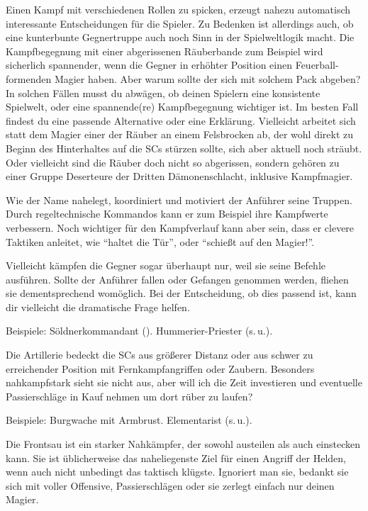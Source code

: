 Einen Kampf mit verschiedenen Rollen zu spicken, erzeugt nahezu automatisch interessante Entscheidungen für die Spieler.
Zu Bedenken ist allerdings auch, ob eine kunterbunte Gegnertruppe auch noch Sinn in der Spielweltlogik macht.
Die Kampfbegegnung mit einer abgerissenen Räuberbande zum Beispiel wird sicherlich spannender, wenn die Gegner in erhöhter Position einen Feuerball-formenden Magier haben.
Aber warum sollte der sich mit solchem Pack abgeben?
In solchen Fällen musst du abwägen, ob deinen Spielern eine konsistente Spielwelt, oder eine spannende(re) Kampfbegegnung wichtiger ist. 
Im besten Fall findest du eine passende Alternative oder eine Erklärung.
Vielleicht arbeitet sich statt dem Magier einer der Räuber an einem Felsbrocken ab, der wohl direkt zu Beginn des Hinterhaltes auf die SCs stürzen sollte, sich aber aktuell noch sträubt.
Oder vielleicht sind die Räuber doch nicht so abgerissen, sondern gehören zu einer Gruppe Deserteure der Dritten Dämonenschlacht, inklusive Kampfmagier.

Wie der Name nahelegt, koordiniert und motiviert der Anführer seine Truppen.
Durch regeltechnische Kommandos kann er zum Beispiel ihre Kampfwerte verbessern.
Noch wichtiger für den Kampfverlauf kann aber sein, dass er clevere Taktiken anleitet, wie \enquote{haltet die Tür}, oder \enquote{schießt auf den Magier!}.

Vielleicht kämpfen die Gegner sogar überhaupt nur, weil sie seine Befehle ausführen.
Sollte der Anführer fallen oder Gefangen genommen werden, fliehen sie dementsprechend womöglich.
Bei der Entscheidung, ob dies passend ist, kann dir vielleicht die dramatische Frage helfen.

Beispiele: Söldnerkommandant (). Hummerier-Priester (s.\,u.).

Die Artillerie bedeckt die SCs aus größerer Distanz oder aus schwer zu erreichender Position mit Fernkampfangriffen oder Zaubern.
Besonders nahkampfstark sieht sie nicht aus, aber will ich die Zeit investieren und eventuelle Passierschläge in Kauf nehmen um dort rüber zu laufen?

Beispiele: Burgwache mit Armbrust. Elementarist (s.\,u.).





Die Frontsau ist ein starker Nahkämpfer, der sowohl austeilen als auch einstecken kann.
Sie ist üblicherweise das naheliegenste Ziel für einen Angriff der Helden, wenn auch nicht unbedingt das taktisch klügste.
Ignoriert man sie, bedankt sie sich mit voller Offensive, Passierschlägen oder sie zerlegt einfach nur deinen Magier.

